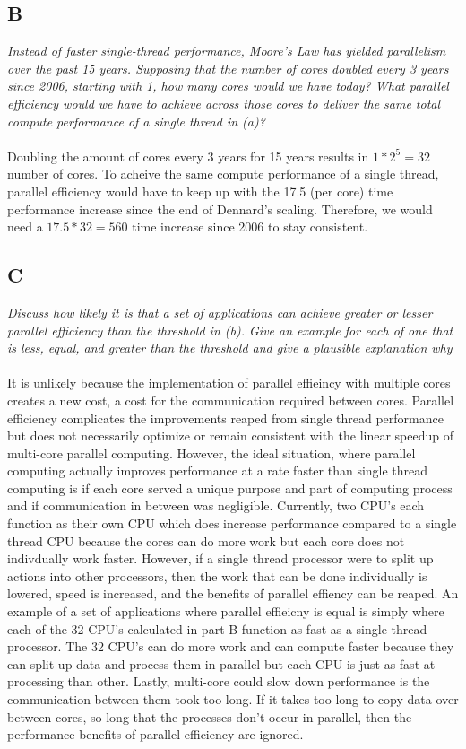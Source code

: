 \documentclass[10pt]{article}
\begin{document}
\subsection{B}
\textit{Instead of faster single-thread performance, Moore’s Law has yielded parallelism over
the past 15 years. Supposing that the number of cores doubled every 3 years since 2006, 
starting with 1, how many cores would we have today? What parallel efficiency would we have to 
achieve across those cores to deliver the same total compute performance of a single thread in (a)?}
\paragraph{} Doubling the amount of cores every 3 years for 15 years results in $1 * 2^5 = 32$ number of cores. 
To acheive the same compute performance of a single thread, parallel efficiency would have to keep up with the 
17.5 (per core) time performance increase since the end of Dennard's scaling. Therefore, we would need a $17.5 * 32 = 560$ time increase 
since 2006 to stay consistent.  
\subsection{C}
\textit{Discuss how likely it is that a set of applications can achieve greater or lesser parallel
efficiency than the threshold in (b). Give an example for each of one that is less, equal,
and greater than the threshold and give a plausible explanation why}
\paragraph{} It is unlikely because the implementation of parallel effieincy with multiple cores creates a new cost, a cost for 
the communication required between cores. Parallel efficiency complicates the improvements reaped from single thread performance 
but does not necessarily optimize or remain consistent with the linear speedup of multi-core parallel computing. However, the ideal
situation, where parallel computing actually improves performance at a rate faster than single thread computing is if each core served a unique 
purpose and part of computing process and if communication in between was negligible. Currently, two CPU's each function as their own CPU which does 
increase performance compared to a single thread CPU because the cores can do more work but each core does not indivdually work faster. However, if a single thread
processor were to split up actions into other processors, then the work that can be done individually is lowered, speed is increased, and the benefits
of parallel effiency can be reaped. An example of a set of applications where parallel effieicny is equal is simply where each of the 32 CPU's calculated in part B 
function as fast as a single thread processor. The 32 CPU's can do more work and can compute faster because they can split up data and process them in parallel 
but each CPU is just as fast at processing than other. Lastly, multi-core could slow down performance is the communication between them took too long. If it takes too long
to copy data over between cores, so long that the processes don't occur in parallel, then the performance benefits of parallel efficiency are ignored. 
\end{document}
